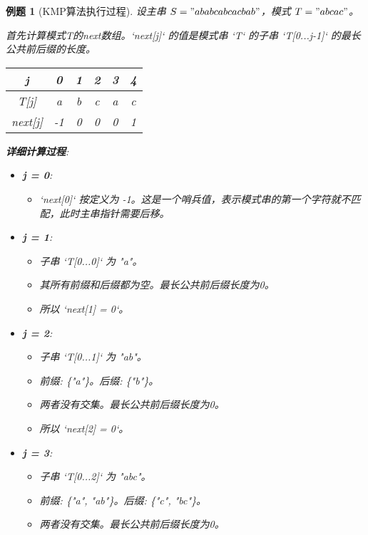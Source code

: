 \documentclass[12pt,a4paper]{amsart}
\newtheorem{example}{例题}[section]
\begin{document}
\begin{example}[KMP算法执行过程]
设主串 $S = "ababcabcacbab"$，模式 $T = "abcac"$。

首先计算模式T的next数组。`next[j]` 的值是模式串 `T` 的子串 `T[0...j-1]` 的最长公共前后缀的长度。

\begin{center}
\begin{tabular}{|c|c|c|c|c|c|}
\hline
j & 0 & 1 & 2 & 3 & 4 \\
\hline
T[j] & a & b & c & a & c \\
\hline
next[j] & -1 & 0 & 0 & 0 & 1 \\
\hline
\end{tabular}
\end{center}
\textbf{详细计算过程}:
\begin{itemize}
    \item \textbf{j = 0}: 
        \begin{itemize}
            \item `next[0]` 按定义为 -1。这是一个哨兵值，表示模式串的第一个字符就不匹配，此时主串指针需要后移。
        \end{itemize}
    \item \textbf{j = 1}: 
        \begin{itemize}
            \item 子串 `T[0...0]` 为 "a"。
            \item 其所有前缀和后缀都为空。最长公共前后缀长度为0。
            \item 所以 `next[1] = 0`。
        \end{itemize}
    \item \textbf{j = 2}: 
        \begin{itemize}
            \item 子串 `T[0...1]` 为 "ab"。
            \item 前缀: \{"a"\}。后缀: \{"b"\}。
            \item 两者没有交集。最长公共前后缀长度为0。
            \item 所以 `next[2] = 0`。
        \end{itemize}
    \item \textbf{j = 3}: 
        \begin{itemize}
            \item 子串 `T[0...2]` 为 "abc"。
            \item 前缀: \{"a", "ab"\}。后缀: \{"c", "bc"\}。
            \item 两者没有交集。最长公共前后缀长度为0。

\end{itemize}
\end{itemize}
\end{example}
\end{document}
